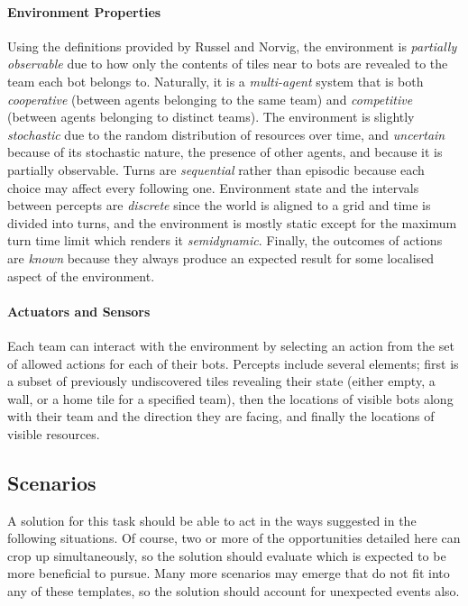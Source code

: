 \documentclass[a4paper,10pt]{article}
\begin{document}
\paragraph{Environment Properties}
Using the definitions provided by Russel and Norvig\cite{norvig10}, the environment is \emph{partially observable} due to how only the contents of tiles near to bots are revealed to the team each bot belongs to. Naturally, it is a \emph{multi-agent} system that is both \emph{cooperative} (between agents belonging to the same team) and \emph{competitive} (between agents belonging to distinct teams). The environment is slightly \emph{stochastic} due to the random distribution of resources over time, and \emph{uncertain} because of its stochastic nature, the presence of other agents, and because it is partially observable. Turns are \emph{sequential} rather than episodic because each choice may affect every following one. Environment state and the intervals between percepts are \emph{discrete} since the world is aligned to a grid and time is divided into turns, and the environment is mostly static except for the maximum turn time limit which renders it \emph{semidynamic}. Finally, the outcomes of actions are \emph{known} because they always produce an expected result for some localised aspect of the environment.

\paragraph{Actuators and Sensors}
Each team can interact with the environment by selecting an action from the set of allowed actions for each of their bots. Percepts include several elements; first is a subset of previously undiscovered tiles revealing their state (either empty, a wall, or a home tile for a specified team), then the locations of visible bots along with their team and the direction they are facing, and finally the locations of visible resources.

\subsection{Scenarios}
A solution for this task should be able to act in the ways suggested in the following situations. Of course, two or more of the opportunities detailed here can crop up simultaneously, so the solution should evaluate which is expected to be more beneficial to pursue. Many more scenarios may emerge that do not fit into any of these templates, so the solution should account for unexpected events also.
\end{document}
